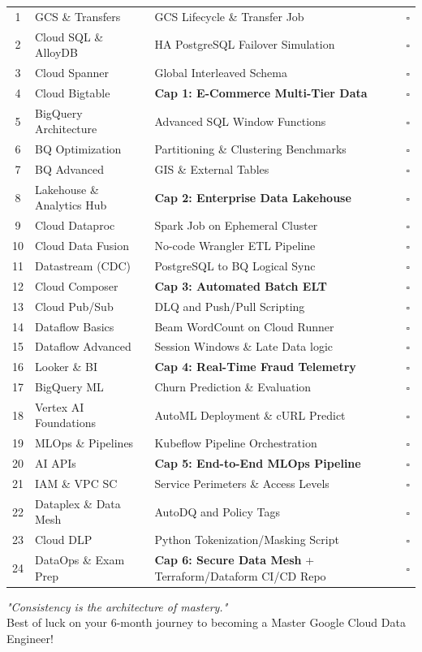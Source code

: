 \documentclass[11pt, a4paper]{article}
\begin{document}
\begin{center}
\begin{longtable}{@{} c l p{7cm} c @{}}
1 & GCS \& Transfers & GCS Lifecycle \& Transfer Job & $\square$ \\
2 & Cloud SQL \& AlloyDB & HA PostgreSQL Failover Simulation & $\square$ \\
3 & Cloud Spanner & Global Interleaved Schema & $\square$ \\
4 & Cloud Bigtable & \textbf{Cap 1: E-Commerce Multi-Tier Data} & $\square$ \\
\midrule
5 & BigQuery Architecture & Advanced SQL Window Functions & $\square$ \\
6 & BQ Optimization & Partitioning \& Clustering Benchmarks & $\square$ \\
7 & BQ Advanced & GIS \& External Tables & $\square$ \\
8 & Lakehouse \& Analytics Hub & \textbf{Cap 2: Enterprise Data Lakehouse} & $\square$ \\
\midrule
9 & Cloud Dataproc & Spark Job on Ephemeral Cluster & $\square$ \\
10 & Cloud Data Fusion & No-code Wrangler ETL Pipeline & $\square$ \\
11 & Datastream (CDC) & PostgreSQL to BQ Logical Sync & $\square$ \\
12 & Cloud Composer & \textbf{Cap 3: Automated Batch ELT} & $\square$ \\
\midrule
13 & Cloud Pub/Sub & DLQ and Push/Pull Scripting & $\square$ \\
14 & Dataflow Basics & Beam WordCount on Cloud Runner & $\square$ \\
15 & Dataflow Advanced & Session Windows \& Late Data logic & $\square$ \\
16 & Looker \& BI & \textbf{Cap 4: Real-Time Fraud Telemetry} & $\square$ \\
\midrule
17 & BigQuery ML & Churn Prediction \& Evaluation & $\square$ \\
18 & Vertex AI Foundations & AutoML Deployment \& cURL Predict & $\square$ \\
19 & MLOps \& Pipelines & Kubeflow Pipeline Orchestration & $\square$ \\
20 & AI APIs & \textbf{Cap 5: End-to-End MLOps Pipeline} & $\square$ \\
\midrule
21 & IAM \& VPC SC & Service Perimeters \& Access Levels & $\square$ \\
22 & Dataplex \& Data Mesh & AutoDQ and Policy Tags & $\square$ \\
23 & Cloud DLP & Python Tokenization/Masking Script & $\square$ \\
24 & DataOps \& Exam Prep & \textbf{Cap 6: Secure Data Mesh} + Terraform/Dataform CI/CD Repo & $\square$ \\

\end{longtable}
\end{center}

\vspace{1cm}
\begin{center}
    \textit{"Consistency is the architecture of mastery."} \\
    Best of luck on your 6-month journey to becoming a Master Google Cloud Data Engineer!
\end{center}
\end{document}
